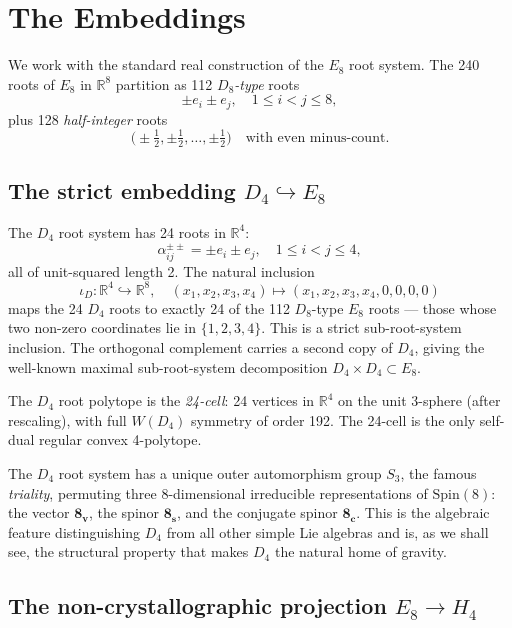 \documentclass[12pt]{article}
\begin{document}
\section{The Embeddings}\label{sec:embeddings}

We work with the standard real construction of the $E_8$ root system. The 240 roots of $E_8$ in $\mathbb{R}^8$ partition as 112 \emph{$D_8$-type} roots
\[
\pm e_i \pm e_j, \quad 1 \leq i < j \leq 8,
\]
plus 128 \emph{half-integer} roots
\[
\bigl(\pm \tfrac{1}{2}, \pm \tfrac{1}{2}, \ldots, \pm \tfrac{1}{2}\bigr) \quad \text{with even minus-count}.
\]

\subsection{The strict embedding $D_4 \hookrightarrow E_8$}\label{sec:emb:d4}

The $D_4$ root system has 24 roots in $\mathbb{R}^4$:
\[
\alpha_{ij}^{\pm\pm} = \pm e_i \pm e_j, \quad 1 \leq i < j \leq 4,
\]
all of unit-squared length 2. The natural inclusion
\begin{equation}
\iota_D: \mathbb{R}^4 \hookrightarrow \mathbb{R}^8, \quad
(x_1, x_2, x_3, x_4) \mapsto (x_1, x_2, x_3, x_4, 0, 0, 0, 0)
\end{equation}
maps the 24 $D_4$ roots to exactly 24 of the 112 $D_8$-type $E_8$ roots --- those whose two non-zero coordinates lie in $\{1,2,3,4\}$. This is a strict sub-root-system inclusion. The orthogonal complement carries a second copy of $D_4$, giving the well-known maximal sub-root-system decomposition $D_4 \times D_4 \subset E_8$.

The $D_4$ root polytope is the \emph{24-cell}: 24 vertices in $\mathbb{R}^4$ on the unit 3-sphere (after rescaling), with full $W(D_4)$ symmetry of order 192. The 24-cell is the only self-dual regular convex 4-polytope.

The $D_4$ root system has a unique outer automorphism group $S_3$, the famous \emph{triality}, permuting three 8-dimensional irreducible representations of $\mathrm{Spin}(8)$: the vector $\mathbf{8_v}$, the spinor $\mathbf{8_s}$, and the conjugate spinor $\mathbf{8_c}$. This is the algebraic feature distinguishing $D_4$ from all other simple Lie algebras and is, as we shall see, the structural property that makes $D_4$ the natural home of gravity.

\subsection{The non-crystallographic projection $E_8 \to H_4$}\label{sec:emb:h4}
\end{document}
